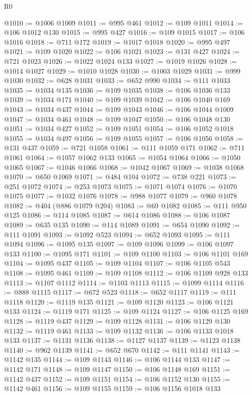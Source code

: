 \begin{lexlean}{R0}
\begin{coremodule}
@1010 := @1006 @1009
@1011 := @995 @461
@1012 := @109 @1011
@1014 := @106 @1012 @130
@1015 := @995 @427
@1016 := @109 @1015
@1017 := @106 @1016
@1018 := @711 @172
@1019 := @1017 @1018
@1020 := @995 @497
@1021 := @109 @1020
@1022 := @106 @1021
@1023 := @131 @427
@1024 := @721 @1023
@1026 := @1022 @1024 @133
@1027 := @1019 @1026
@1028 := @1014 @1027
@1029 := @1010 @1028
@1030 := @1003 @1029
@1031 := @999 @1030
@1032 := @628 @1031
@1033 := @652 @990
@1034 := @111 @1033
@1035 := @1034 @135
@1036 := @109 @1035
@1038 := @106 @1036 @133
@1039 := @1034 @171
@1040 := @109 @1039
@1042 := @106 @1040 @169
@1043 := @1034 @437
@1044 := @109 @1043
@1046 := @106 @1044 @1009
@1047 := @1034 @461
@1048 := @109 @1047
@1050 := @106 @1048 @130
@1051 := @1034 @427
@1052 := @109 @1051
@1054 := @106 @1052 @1018
@1055 := @1034 @497
@1056 := @109 @1055
@1057 := @106 @1056
@1058 := @131 @437
@1059 := @721 @1058
@1061 := @111 @1059 @171
@1062 := @711 @1061
@1064 := @1057 @1062 @133
@1065 := @1054 @1064
@1066 := @1050 @1065
@1067 := @1046 @1066
@1068 := @1042 @1067
@1069 := @1038 @1068
@1070 := @650 @1069
@1071 := @484 @104
@1072 := @738 @221
@1073 := @251 @1072
@1074 := @253 @1073
@1075 := @1071 @1074
@1076 := @1070 @1075
@1077 := @1032 @1076
@1078 := @988 @1077
@1079 := @960 @1078
@1082 := @404 (@886 @1079 @204)
@1083 := @69 @1082
@1085 := @111 @950 @125
@1086 := @114 @1085
@1087 := @614 @1086
@1088 := @106 @1087
@1089 := @635 @135
@1090 := @114 @1089
@1091 := @654 @1090
@1092 := @111 @1091
@1093 := @1092 @523
@1094 := @652 @1093
@1095 := @111 @1094
@1096 := @1095 @135
@1097 := @109 @1096
@1099 := @106 @1097 @133
@1100 := @1095 @171
@1101 := @109 @1100
@1103 := @106 @1101 @169
@1104 := @1095 @437
@1105 := @109 @1104
@1107 := @106 @1105 @543
@1108 := @1095 @461
@1109 := @109 @1108
@1112 := @106 @1109 @928 @133
@1113 := @1107 @1112
@1114 := @1103 @1113
@1115 := @1099 @1114
@1116 := @888 @1115
@1117 := @672 @523
@1118 := @652 @1117
@1119 := @111 @1118
@1120 := @1119 @135
@1121 := @109 @1120
@1123 := @106 @1121 @133
@1124 := @1119 @171
@1125 := @109 @1124
@1127 := @106 @1125 @169
@1128 := @1119 @437
@1129 := @109 @1128
@1131 := @106 @1129 @130
@1132 := @1119 @461
@1133 := @109 @1132
@1136 := @106 @1133 @1018 @133
@1137 := @1131 @1136
@1138 := @1127 @1137
@1139 := @1123 @1138
@1140 := @962 @1139
@1141 := @652 @670
@1142 := @111 @1141
@1143 := @1142 @135
@1144 := @109 @1143
@1146 := @106 @1144 @133
@1147 := @1142 @171
@1148 := @109 @1147
@1150 := @106 @1148 @169
@1151 := @1142 @437
@1152 := @109 @1151
@1154 := @106 @1152 @130
@1155 := @1142 @461
@1156 := @109 @1155
@1159 := @106 @1156 @1018 @133

\end{coremodule}
\end{lexlean}
